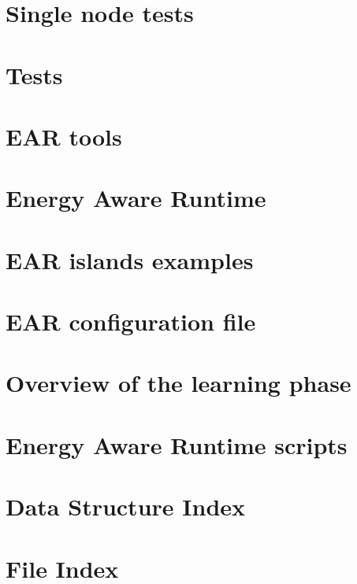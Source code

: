 \documentclass[twoside]{book}
\newcommand{\+}{\discretionary{\mbox{\scriptsize$\hookleftarrow$}}{}{}}
\begin{document}
\chapter{Single node tests}
\label{md_src_tests_plugin_single_node_README}
\hypertarget{md_src_tests_plugin_single_node_README}{}

\chapter{Tests}
\label{md_src_tests_README}
\hypertarget{md_src_tests_README}{}

\chapter{E\+AR tools}
\label{md_src_tools_README}
\hypertarget{md_src_tools_README}{}

\chapter{Energy Aware Runtime}
\label{md_README}
\hypertarget{md_README}{}

\chapter{E\+AR islands examples}
\label{md_etc_conf_README.islands}
\hypertarget{md_etc_conf_README.islands}{}

\chapter{E\+AR configuration file}
\label{md_etc_conf_README}
\hypertarget{md_etc_conf_README}{}

\chapter{Overview of the learning phase}
\label{md_etc_scripts_learning_README}
\hypertarget{md_etc_scripts_learning_README}{}

\chapter{Energy Aware Runtime scripts}
\label{md_etc_scripts_README}
\hypertarget{md_etc_scripts_README}{}

\chapter{Data Structure Index}

\chapter{File Index}

\end{document}
